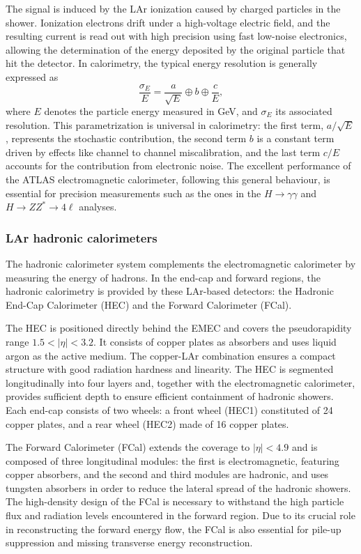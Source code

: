 The signal is induced by the LAr ionization caused by charged particles in the shower. Ionization electrons drift under a high-voltage electric field, and the resulting current is read out with high precision using fast low-noise electronics, allowing the determination of the energy deposited by the original particle that hit the detector. In calorimetry, the typical energy resolution is generally expressed as
\begin{equation}
\frac{\sigma_E}{E} = \frac{a}{\sqrt{E}} \oplus b \oplus \frac{c}{E},
\end{equation}
where $E$ denotes the particle energy measured in GeV, and $\sigma_E$ its associated resolution. This parametrization is universal in calorimetry: the first term, $a/\sqrt{E}$, represents the stochastic contribution, the second term $b$ is a constant term driven by effects like channel to channel miscalibration, and the last term $c/E$ accounts for the contribution from electronic noise. The excellent performance of the ATLAS electromagnetic calorimeter, following this general behaviour, is essential for precision measurements such as the ones in the $H \rightarrow \gamma\gamma$ and $H \rightarrow ZZ^* \rightarrow 4\ell$ analyses.

\subsubsection{LAr hadronic calorimeters}
\label{sec:elehad}

The hadronic calorimeter system complements the electromagnetic calorimeter by measuring the energy of hadrons. In the end-cap and forward regions, the hadronic calorimetry is provided by these LAr-based detectors: the Hadronic End-Cap Calorimeter (HEC) and the Forward Calorimeter (FCal).

The HEC is positioned directly behind the EMEC and covers the pseudorapidity range $1.5 < |\eta| < 3.2$. It consists of copper plates as absorbers and uses liquid argon as the active medium. The copper-LAr combination ensures a compact structure with good radiation hardness and linearity. The HEC is segmented longitudinally into four layers and, together with the electromagnetic calorimeter, provides sufficient depth to ensure efficient containment of hadronic showers. Each end-cap consists of two wheels: a front wheel (HEC1) constituted of 24 copper plates, and a rear wheel (HEC2) made of 16 copper plates.

The Forward Calorimeter (FCal) extends the coverage to $|\eta| < 4.9$ and is composed of three longitudinal modules: the first is electromagnetic, featuring copper absorbers, and the second and third modules are hadronic, and uses tungsten absorbers in order to reduce the lateral spread of the hadronic showers. The high-density design of the FCal is necessary to withstand the high particle flux and radiation levels encountered in the forward region. Due to its crucial role in reconstructing the forward energy flow, the FCal is also essential for pile-up suppression and missing transverse energy reconstruction.

